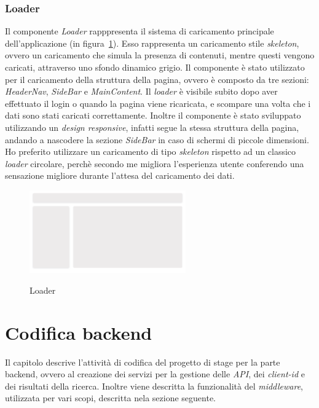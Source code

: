 \subsubsection{Loader}\label{subsubsec:loader}
Il componente \textit{Loader} rapppresenta il sistema di caricamento principale dell'applicazione (in figura~\ref{fig:loader}).
Esso rappresenta un caricamento stile \textit{skeleton}, ovvero un caricamento che simula la presenza di contenuti, mentre questi vengono caricati, attraverso 
uno sfondo dinamico grigio.
Il componente è stato utilizzato per il caricamento della struttura della pagina, ovvero è composto da tre sezioni: \textit{HeaderNav}, \textit{SideBar} e
\textit{MainContent}. Il \textit{loader} è visibile subito dopo aver effettuato il login o quando la pagina viene ricaricata, e scompare una volta che i dati sono stati caricati correttamente.
Inoltre il componente è stato sviluppato utilizzando un \textit{design responsive}, infatti segue la stessa struttura della pagina, andando a nascodere la sezione 
\textit{SideBar} in caso di schermi di piccole dimensioni.
Ho preferito utilizzare un caricamento di tipo \textit{skeleton} rispetto ad un classico \textit{loader} circolare, perchè secondo me migliora l'esperienza utente 
conferendo una sensazione migliore durante l'attesa del caricamento dei dati.

\begin{figure}[ht]
  \centering
  \includegraphics[width=0.6\textwidth, alt={Skeleton loader di caricamento principale dell'applicazione}]{images/frontend/Loader.jpg}
  \caption{Loader}\label{fig:loader}
\end{figure}
\pagebreak

\section{Codifica backend}\label{sec:codifica-backend}
Il capitolo descrive l'attività di codifica del progetto di stage per la parte backend, ovvero al creazione 
dei servizi per la gestione delle \textit{API}, dei \textit{client-id} e dei risultati della ricerca.
Inoltre viene descritta la funzionalità del \textit{middleware}, utilizzata per vari scopi, descritta nela sezione seguente.

